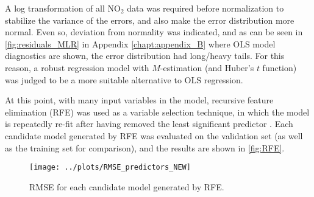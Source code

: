 A log transformation of all NO$_2$ data was required before normalization to stabilize the variance of the errors, and also make the error distribution more normal. Even so, deviation from normality was indicated, and as can be seen in \cref{fig:residuals_MLR} in Appendix \ref{chapt:appendix_B} where OLS model diagnostics are shown, the error distribution had long/heavy tails. For this reason, a robust regression model with $M$-estimation (and Huber's $t$ function) was judged to be a more suitable alternative to OLS regression.

At this point, with many input variables in the model, recursive feature elimination (RFE) was used as a variable selection technique, in which the model is repeatedly re-fit after having removed the least significant predictor \cite{Faraway2020}. Each candidate model generated by RFE was evaluated on the validation set (as well as the training set for comparison), and the results are shown in \vref{fig:RFE}. 

\begin{figure}[h] 
\begin{center}
\texttt{[image: ../plots/RMSE\_predictors\_NEW]}
\caption{RMSE for each candidate model generated by RFE.}
\label{fig:RFE}
\end{center}
\end{figure}

